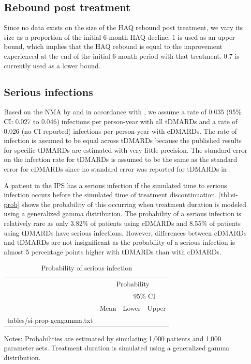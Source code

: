 \documentclass[11pt,final,fleqn]{article}
\makeatletter
\theoremstyle{plain}
\newcommand*\ExpandableInput[1]{\@@input#1 }
\makeatother
\begin{document}
\FloatBarrier


\subsection{Rebound post treatment}
Since no data exists on the size of the HAQ rebound post treatment, we vary its size as a proportion of the initial 6-month HAQ decline. 1 is used as an upper bound, which implies that the HAQ rebound is equal to the improvement experienced at the end of the initial 6-month period with that treatment. 0.7 is currently used as a lower bound.

\subsection{Serious infections}
Based on the NMA by \citet{singh2011adverse} and in accordance with \citet{stevenson2016adalimumab}, we assume a rate of 0.035 (95\% CI: 0.027 to 0.046) infections per person-year with all tDMARDs and a rate of 0.026 (no CI reported) infections per person-year with cDMARDs. The rate of infection is assumed to be equal across tDMARDs because the published results for specific tDMARDs are estimated with very little precision. The standard error on the infection rate for tDMARDs is assumed to be the same as the standard error for cDMARDs since no standard error was reported for tDMARDs in \citet{singh2011adverse}.


A patient in the IPS has a serious infection if the simulated time to serious infection occurs before the simulated time of treatment discontinuation. \autoref{tbl:si-prob} shows the probability of this occurring when treatment duration is modeled using a generalized gamma distribution. The probability of a serious infection is relatively rare as only 3.82\% of patients using cDMARDs and 8.55\% of patients using tDMARDs have serious infections. However, differences between cDMARDs and tDMARDs are not insignificant as the probability of a serious infection is almost 5 percentage points higher with tDMARDs than with cDMARDs.

\begin{table}[!ht]
\begin{center}
\begin{threeparttable}
\caption{Probability of serious infection} \label{tbl:si-prob}
\begin{tabularx}{\textwidth}{@{\extracolsep{\fill}}lrrr}
\hline
\multicolumn{1}{l}{} & \multicolumn{3}{c}{Probability} \\
\cmidrule{2-4} 
\multicolumn{2}{l}{} & \multicolumn{2}{c}{95\% CI} \\
\cmidrule{3-4} 
\multicolumn{1}{c}{} & \multicolumn{1}{c}{Mean} & \multicolumn{1}{c}{Lower} & \multicolumn{1}{c}{Upper} \\
\hline
\ExpandableInput{tables/si-prop-gengamma.txt}
\hline
\end{tabularx}
\scriptsize
Notes: Probabilities are estimated by simulating 1,000 patients and 1,000 parameter sets. Treatment duration is simulated using a generalized gamma distribution. 
\end{threeparttable}
\end{center}
\end{table}
\end{document}
